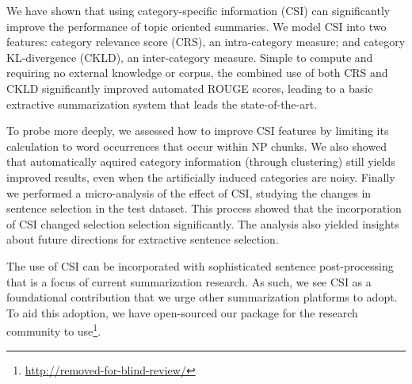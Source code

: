 We have shown that using category-specific information (CSI) can significantly improve the performance of topic oriented summaries.  We model CSI into two features: category relevance score (CRS), an intra-category measure; and category KL-divergence (CKLD), an inter-category measure.  Simple to compute and requiring no external knowledge or corpus, the combined use of both CRS and CKLD significantly improved automated ROUGE scores, leading to a basic extractive summarization system that leads the state-of-the-art. 

To probe more deeply, we assessed how to improve CSI features by limiting its calculation to word occurrences that occur within NP chunks.  We also showed that automatically aquired category information (through clustering) still yields improved results, even when the artificially induced categories are noisy.  Finally we performed a micro-analysis of the effect of CSI, studying the changes in sentence selection in the test dataset.  This process showed that the incorporation of CSI changed selection selection significantly.  The analysis also yielded insights about future directions for extractive sentence selection. 

The use of CSI can be incorporated with sophisticated sentence post-processing that is a focus of current summarization research.  As such, we see CSI as a foundational contribution that we urge other summarization platforms to adopt.  To aid this adoption, we have open-sourced our package for the research community to use\footnote{\url{http://removed-for-blind-review/}}.

